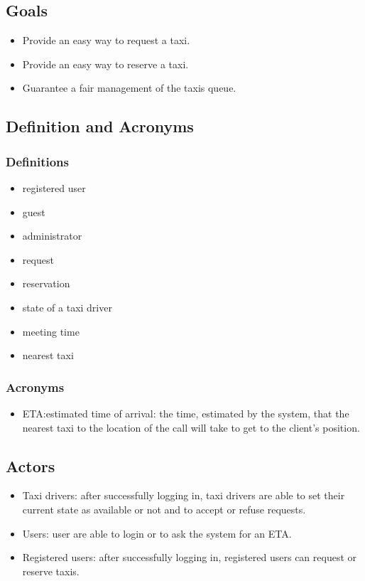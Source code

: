 \documentclass{article}
\begin{document}
	\subsection{Goals}
	\begin{itemize}
		\item Provide an easy way to request a taxi.
		\item Provide an easy way to reserve a taxi.
		\item Guarantee a fair management of the taxis queue.
	\end{itemize}

	\subsection{Definition and Acronyms}

	\subsubsection{Definitions}
	\begin{itemize}
		\item registered user
		\item guest
		\item administrator
		\item request
		\item reservation
		\item state of a taxi driver
		\item meeting time
		\item nearest taxi
	\end{itemize}

	\subsubsection{Acronyms}
	\begin{itemize}
		\item ETA:\@ estimated time of arrival: the time, estimated by the system, that the nearest taxi to the location of the call will take to get to the client’s position.
	\end{itemize}

	\subsection{Actors}
	\begin{itemize}
		\item Taxi drivers: after successfully logging in, taxi drivers are able to set their current state as available or not and to accept or refuse requests.
		\item Users: user are able to login or to ask the system for an ETA.\@
		\item Registered users: after successfully logging in, registered users can request or reserve taxis.
	\end{itemize}
\end{document}
